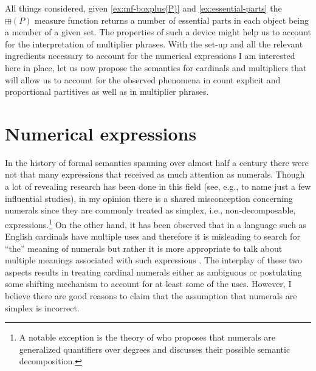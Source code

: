 	All things considered, given \ref{ex:mf-boxplus(P)} and \ref{ex:essential-parts} the $\boxplus(P)$ measure function returns a number of essential parts in each object being a member of a given set. The properties of such a device might help us to account for the interpretation of multiplier phrases. With the set-up and all the relevant ingredients necessary to account for the numerical expressions I am interested here in place, let us now propose the semantics for cardinals and multipliers that will allow us to account for the observed phenomena in count explicit and proportional partitives as well as in multiplier phrases.
	
	\section{Numerical expressions}\label{sec:numerical-expressions}
	
	In the history of formal semantics spanning over almost half a century there were not that many expressions that received as much attention as numerals. Though a lot of revealing research has been done in this field (see, e.g., \citealt{horn1972semantic,barwise_cooper1981generalized,scha1981distributive,krifka1999least,landman2003predicate,landman2004indefinites,hofweber2005number,ionin_matushansky2006composition,geurts2006take,nouwen2010two,kennedy2013scalar,rothstein2013fregean,rothstein2017semantics} to name just a few influential studies), in my opinion there is a shared misconception concerning numerals since they are commonly treated as simplex, i.e., non-decomposable, expressions.\footnote{A notable exception is the theory of \citet{kennedy2013scalar} who proposes that numerals are generalized quantifiers over degrees and discusses their possible semantic decomposition.} On the other hand, it has been observed that in a language such as English cardinals have multiple uses and therefore it is misleading to search for ``the'' meaning of numerals but rather it is more appropriate to talk about multiple meanings associated with such expressions \citep[e.g.,][]{bultinck2005numerous,geurts2006take}. The interplay of these two aspects results in treating cardinal numerals either as ambiguous or postulating some shifting mechanism to account for at least some of the uses. However, I believe there are good reasons to claim that the assumption that numerals are simplex is incorrect. 
	
